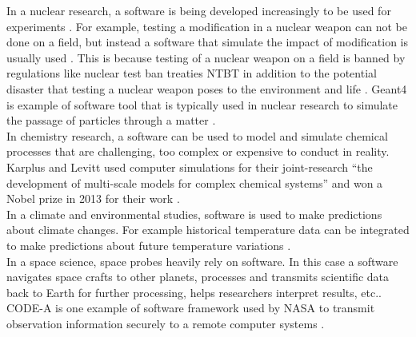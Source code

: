 In a nuclear research, a software is being developed increasingly to be used for experiments \citep{yan2017case}. For example, testing a modification in a nuclear weapon can not be done on a field, but instead a software that simulate the impact of modification is usually used \citep{kanewala2014testing}. This is because testing of a nuclear weapon on a field is banned by regulations like nuclear test ban treaties \ac{NTBT} in addition to the potential disaster that testing a nuclear weapon poses to the environment and life \citep{enwiki:1053274189}. \ac{Geant4} is example of software tool that is typically used in nuclear research to simulate the passage of particles through a matter \citep{enwiki:1077695266}.  \\


In chemistry research, a software can be used to model and simulate chemical processes that are challenging, too complex or expensive to conduct in reality. Karplus and Levitt used computer simulations for their joint-research “the development of multi-scale models for complex chemical systems”  and won a Nobel prize in 2013 for their work \citep{storer2017bridging, andre2014nobel}.\\

In a climate and environmental studies, software is used to make predictions about climate changes. For example historical temperature data can be integrated to make predictions about future temperature variations \citep{storer2017bridging}.  \\


In a space science, space probes heavily rely on software. In this case a software navigates space crafts to other planets, processes and transmits scientific data back to Earth for further processing, helps researchers interpret results, etc.\citep{lutz2011software}. CODE-A is one example of software framework used by \ac{NASA} to transmit observation information securely to a remote computer systems \citep{NASA2022}. \\


